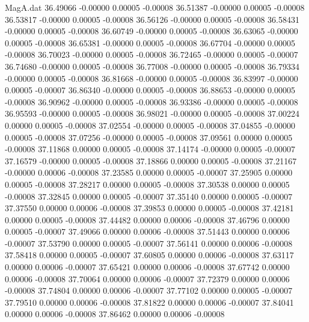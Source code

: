 \begin{filecontents}{MagA.dat}
  36.49066   -0.00000    0.00005   -0.00008
  36.51387   -0.00000    0.00005   -0.00008
  36.53817   -0.00000    0.00005   -0.00008
  36.56126   -0.00000    0.00005   -0.00008
  36.58431   -0.00000    0.00005   -0.00008
  36.60749   -0.00000    0.00005   -0.00008
  36.63065   -0.00000    0.00005   -0.00008
  36.65381   -0.00000    0.00005   -0.00008
  36.67704   -0.00000    0.00005   -0.00008
  36.70023   -0.00000    0.00005   -0.00008
  36.72465   -0.00000    0.00005   -0.00007
  36.74680   -0.00000    0.00005   -0.00008
  36.77008   -0.00000    0.00005   -0.00008
  36.79334   -0.00000    0.00005   -0.00008
  36.81668   -0.00000    0.00005   -0.00008
  36.83997   -0.00000    0.00005   -0.00007
  36.86340   -0.00000    0.00005   -0.00008
  36.88653   -0.00000    0.00005   -0.00008
  36.90962   -0.00000    0.00005   -0.00008
  36.93386   -0.00000    0.00005   -0.00008
  36.95593   -0.00000    0.00005   -0.00008
  36.98021   -0.00000    0.00005   -0.00008
  37.00224    0.00000    0.00005   -0.00008
  37.02554   -0.00000    0.00005   -0.00008
  37.04855   -0.00000    0.00005   -0.00008
  37.07256   -0.00000    0.00005   -0.00008
  37.09561    0.00000    0.00005   -0.00008
  37.11868    0.00000    0.00005   -0.00008
  37.14174   -0.00000    0.00005   -0.00007
  37.16579   -0.00000    0.00005   -0.00008
  37.18866    0.00000    0.00005   -0.00008
  37.21167   -0.00000    0.00006   -0.00008
  37.23585    0.00000    0.00005   -0.00007
  37.25905    0.00000    0.00005   -0.00008
  37.28217    0.00000    0.00005   -0.00008
  37.30538    0.00000    0.00005   -0.00008
  37.32845    0.00000    0.00005   -0.00007
  37.35140    0.00000    0.00005   -0.00007
  37.37550    0.00000    0.00006   -0.00008
  37.39853    0.00000    0.00005   -0.00008
  37.42181    0.00000    0.00005   -0.00008
  37.44482    0.00000    0.00006   -0.00008
  37.46796    0.00000    0.00005   -0.00007
  37.49066    0.00000    0.00006   -0.00008
  37.51443    0.00000    0.00006   -0.00007
  37.53790    0.00000    0.00005   -0.00007
  37.56141    0.00000    0.00006   -0.00008
  37.58418    0.00000    0.00005   -0.00007
  37.60805    0.00000    0.00006   -0.00008
  37.63117    0.00000    0.00006   -0.00007
  37.65421    0.00000    0.00006   -0.00008
  37.67742    0.00000    0.00006   -0.00008
  37.70064    0.00000    0.00006   -0.00007
  37.72379    0.00000    0.00006   -0.00008
  37.74804    0.00000    0.00006   -0.00007
  37.77102    0.00000    0.00005   -0.00007
  37.79510    0.00000    0.00006   -0.00008
  37.81822    0.00000    0.00006   -0.00007
  37.84041    0.00000    0.00006   -0.00008
  37.86462    0.00000    0.00006   -0.00008

\end{filecontents}
